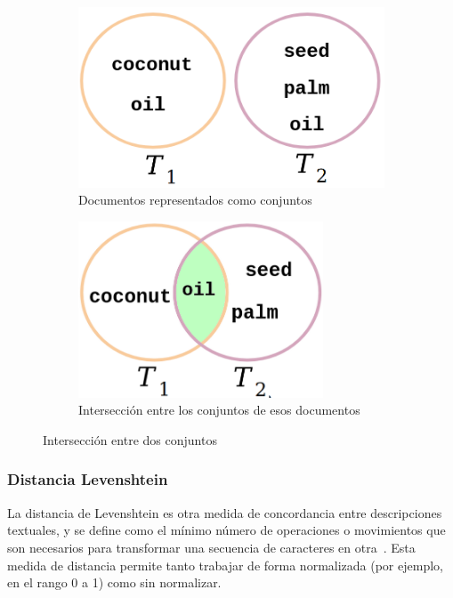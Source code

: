\begin{figure}[h!]
    \centering
    \begin{subfigure}[b]{0.47\textwidth}
        \includegraphics[width=1.0\textwidth]{imagenes/img1.png}
        \caption{Documentos representados como conjuntos}
    \end{subfigure}
    \hspace{5mm}
    \begin{subfigure}[b]{0.47\textwidth}
        \centering
        \includegraphics[width=0.80\textwidth]{imagenes/img5.png}
        \caption{Intersección entre los conjuntos de esos documentos}
    \end{subfigure}
    \caption{Intersección entre dos conjuntos}
    \label{fig:jaccard}
\end{figure}





\subsubsection{Distancia Levenshtein}
La distancia de Levenshtein es otra medida de concordancia entre descripciones textuales, y se define como el mínimo número de operaciones o movimientos que son necesarios para transformar una secuencia de caracteres en otra~\cite{yujian2007normalized}. Esta medida de distancia permite tanto trabajar de forma normalizada (por ejemplo, en el rango 0 a 1) como sin normalizar. 

